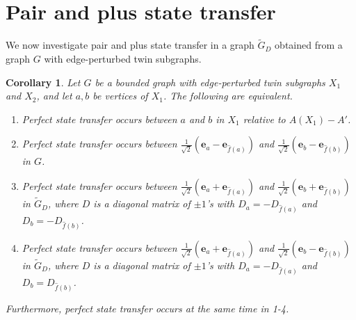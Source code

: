 \documentclass[12pt,a4paper]{article}
\newtheorem{cor}{Corollary}
\def \e {{\bf e}}
\def \e {{\mathbf e}}
\newcommand{\ob}[1]{\left(#1\right)}
\newcommand\sarojini[1]{{\bf \textcolor{magenta}{(Sarojini: #1)}}}
\begin{document}


\section{Pair and plus state transfer}\label{sec:prpl}

We now investigate pair and plus state transfer in a graph $\tilde{G}_D$ obtained from a graph $G$ with edge-perturbed twin subgraphs.

\begin{cor}
\label{mainres}
Let $G$ be a bounded graph with edge-perturbed twin subgraphs $X_1$ and $X_2$, and let $a,b$ be vertices of $X_1$. The following are equivalent.
\begin{enumerate}
\item Perfect state transfer occurs between $a$ and $b$ in $X_1$ relative to $A(X_1)-A'$.
\item Perfect state transfer occurs between $\frac{1}{\sqrt2}(\e_a-\e_{\hat{f}(a)})$ and $\frac{1}{\sqrt2}(\e_b-\e_{\hat{f}(b)})$ in $G$.%
\item Perfect state transfer occurs between $\frac{1}{\sqrt2}(\e_a+\e_{\hat{f}(a)})$ and $\frac{1}{\sqrt2}(\e_b+\e_{\hat{f}(b)})$ in $\tilde{G}_D$, where $D$ is a diagonal matrix of $\pm 1$'s with $D_a=-D_{\hat{f}(a)}$ and $D_b=-D_{\hat{f}(b)}$.
\item Perfect state transfer occurs between $\frac{1}{\sqrt2}(\e_a+\e_{\hat{f}(a)})$ and $\frac{1}{\sqrt2}(\e_b-\e_{\hat{f}(b)})$ in $\tilde{G}_D$, where $D$ is a diagonal matrix of $\pm 1$'s with $D_a=-D_{\hat{f}(a)}$ and $D_b=D_{\hat{f}(b)}$.
\end{enumerate}
Furthermore, perfect state transfer occurs at the same time in 1-4.
\end{cor}
\end{document}
